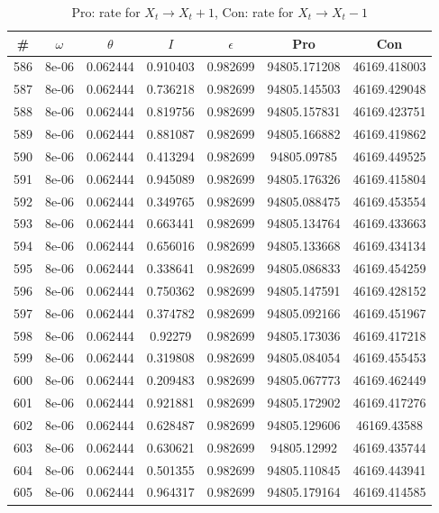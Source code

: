 \newpage
\begin{table}
\caption{Pro: rate for $X_t \rightarrow X_t + 1$, Con: rate for $X_t \rightarrow X_t - 1$}
\begin{tabular*}{\linewidth}{c|c|c|c|c|c|c}
\# & $\omega$ & $\theta$ & $I$ & $\epsilon$ & Pro & Con \\
\hline
586 & 8e-06 & 0.062444 & 0.910403 & 0.982699 & 94805.171208 & 46169.418003\\
587 & 8e-06 & 0.062444 & 0.736218 & 0.982699 & 94805.145503 & 46169.429048\\
588 & 8e-06 & 0.062444 & 0.819756 & 0.982699 & 94805.157831 & 46169.423751\\
589 & 8e-06 & 0.062444 & 0.881087 & 0.982699 & 94805.166882 & 46169.419862\\
590 & 8e-06 & 0.062444 & 0.413294 & 0.982699 & 94805.09785 & 46169.449525\\
591 & 8e-06 & 0.062444 & 0.945089 & 0.982699 & 94805.176326 & 46169.415804\\
592 & 8e-06 & 0.062444 & 0.349765 & 0.982699 & 94805.088475 & 46169.453554\\
593 & 8e-06 & 0.062444 & 0.663441 & 0.982699 & 94805.134764 & 46169.433663\\
594 & 8e-06 & 0.062444 & 0.656016 & 0.982699 & 94805.133668 & 46169.434134\\
595 & 8e-06 & 0.062444 & 0.338641 & 0.982699 & 94805.086833 & 46169.454259\\
596 & 8e-06 & 0.062444 & 0.750362 & 0.982699 & 94805.147591 & 46169.428152\\
597 & 8e-06 & 0.062444 & 0.374782 & 0.982699 & 94805.092166 & 46169.451967\\
598 & 8e-06 & 0.062444 & 0.92279 & 0.982699 & 94805.173036 & 46169.417218\\
599 & 8e-06 & 0.062444 & 0.319808 & 0.982699 & 94805.084054 & 46169.455453\\
600 & 8e-06 & 0.062444 & 0.209483 & 0.982699 & 94805.067773 & 46169.462449\\
601 & 8e-06 & 0.062444 & 0.921881 & 0.982699 & 94805.172902 & 46169.417276\\
602 & 8e-06 & 0.062444 & 0.628487 & 0.982699 & 94805.129606 & 46169.43588\\
603 & 8e-06 & 0.062444 & 0.630621 & 0.982699 & 94805.12992 & 46169.435744\\
604 & 8e-06 & 0.062444 & 0.501355 & 0.982699 & 94805.110845 & 46169.443941\\
605 & 8e-06 & 0.062444 & 0.964317 & 0.982699 & 94805.179164 & 46169.414585\\

\end{tabular*}
\end{table}
